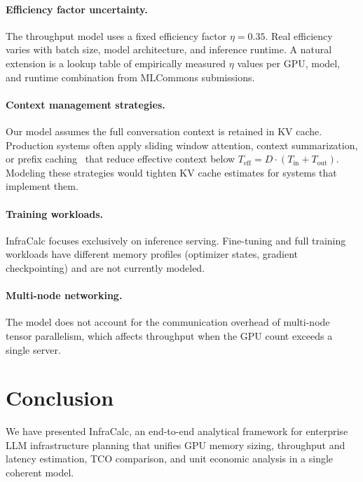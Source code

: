 \documentclass{article}
\begin{document}
\paragraph{Efficiency factor uncertainty.}
The throughput model uses a fixed efficiency factor $\eta{=}0.35$. Real
efficiency varies with batch size, model architecture, and inference runtime.
A natural extension is a lookup table of empirically measured $\eta$ values
per GPU, model, and runtime combination from MLCommons submissions.

\paragraph{Context management strategies.}
Our model assumes the full conversation context is retained in KV cache.
Production systems often apply sliding window attention, context summarization,
or prefix caching~\cite{zheng2023efficiently} that reduce effective context
below $T_{\text{eff}} = D \cdot (T_{\text{in}} + T_{\text{out}})$.
Modeling these strategies would tighten KV cache estimates for systems
that implement them.

\paragraph{Training workloads.}
InfraCalc focuses exclusively on inference serving. Fine-tuning and
full training workloads have different memory profiles (optimizer states,
gradient checkpointing) and are not currently modeled.

\paragraph{Multi-node networking.}
The model does not account for the communication overhead of multi-node
tensor parallelism, which affects throughput when the GPU count exceeds
a single server.

\section{Conclusion}
\label{sec:conclusion}

We have presented InfraCalc, an end-to-end analytical framework for enterprise
LLM infrastructure planning that unifies GPU memory sizing, throughput and
latency estimation, TCO comparison, and unit economic analysis in a single
coherent model.
\end{document}
